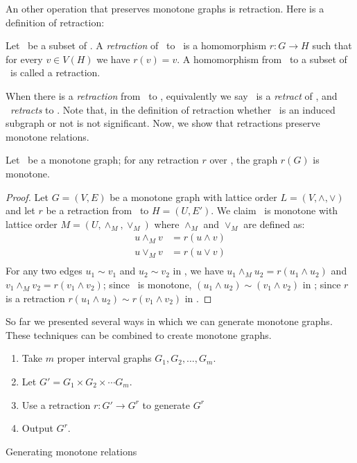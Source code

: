 An other operation that preserves monotone graphs is retraction. Here is a definition
of retraction:

\begin{defi} [Retraction]
Let \mH\ be a subset of \mG\@. A \emph{retraction} of \mG\ to \mH\ is a 
homomorphism \(r: G\to H\) such that for every \(v\in V(H)\) we have
\(r(v) = v\)\@.
A homomorphism from \mG\ to a subset of \mG\ is called a retraction.
\end{defi}
When there is a \emph{retraction} from \mH\ to \mG, equivalently we say
\mH\ is a \emph{retract} of \mG, and \mG\ \emph{retracts} to \mH\@.
Note that, in the definition of retraction whether \mH\ is an induced subgraph or not 
is not significant. Now, we show that retractions preserve monotone relations.

\begin{lemma}
Let \mG\ be a monotone graph; for any retraction \(r\) over \mG, the graph
\(r(G)\) is monotone.
\end{lemma}

\begin{proof}
Let \(G=(V,E)\) be a monotone graph with lattice order \(L=(V, \wedge,\vee)\) and
let \(r\) be a retraction from \mG\ to \(H=(U,E')\)\@. We claim
\mH\ is monotone with lattice order \(M=(U,\wedge_M, \vee_M)\) where
\(\wedge_M\) and \(\vee_M\) are defined as:
\begin{eqnarray*}
u \wedge_M v &= r(u \wedge v) \\
u \vee_M v &= r(u \vee v) \\
\end{eqnarray*}
For any two edges \(u_1 \sim v_1\) and \(u_2 \sim v_2\) in \mH,
we have \(u_1 \wedge_M u_2 = r(u_1 \wedge u_2)\) and \(v_1 \wedge_M v_2 = r(v_1 \wedge v_2)\);
since \mG\ is monotone, \((u_1 \wedge u_2) \sim (v_1 \wedge v_2)\) in \mG;
since \(r\) is a retraction \(r(u_1 \wedge u_2) \sim r(v_1 \wedge v_2)\) in \mH\@.
\end{proof}

So far we presented several ways in which we can generate monotone graphs.
These techniques can be combined to create monotone graphs.
\begin{algorithm}
\begin{enumerate}
\item Take \(m\) proper interval graphs \(G_1,G_2,\dotsc,G_m\)\@.
\item Let \(G' = G_1 \times G_2 \times \dotsb G_m\)\@.
\item Use a retraction \(r:G' \to G^r\) to generate \(G^r\)
\item Output \(G^r\)\@.
\end{enumerate}
\caption{Generating monotone relations}\label{prc:genmon}
\end{algorithm}

